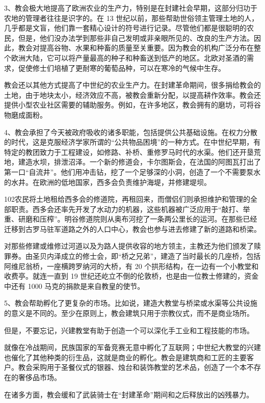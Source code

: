 3、教会极大地提高了欧洲农业的生产力，特别是在封建社会早期，这部分归功于农地的管理者往往是识字的。在 13 世纪以前，那些帮助世俗领主管理土地的人，几乎都是文盲，他们靠一套精心设计的符号进行记录。尽管他们都是很聪明的农民，但是，他们没办法学到那些非自己发明或非亲眼所见的、改良的生产方法。因此，教会对提高谷物、水果和种畜的质量至关重要。因为教会的机构广泛分布在整个欧洲大陆，它可以将产量最高的种子和种畜送到低产的地区。北欧对圣酒的需求，促使修士们培植了更耐寒的葡萄品种，可以在寒冷的气候中生存。

教会还以其他方式提高了中世纪的农业生产力。在封建革命期间，很多捐给教会的土地，由于地块太小，经济效应不高，被教会重新分配，以提高耕作效率。教会还提供小型农业社区需要的辅助服务。例如，在许多地区，教会拥有的磨坊，可将谷物磨成面粉。

4、教会承担了今天被政府吸收的诸多职能，包括提供公共基础设施。在权力分散的时代，这是克服经济学家所谓的“公共物品困境”的一种方式。在中世纪早期，有特定的教团致力于工程建设，如修路、补桥、重修罗马时代的水渠。他们还开垦荒地，建造水坝，排泄沼泽。一个新的修道会，卡尔图斯会，在法国的阿图瓦打出了第一口“自流井”。他们用冲击钻，挖了一个足够深的小洞，创造了一个不需要泵水的水井。在欧洲的低地国家，西多会负责维护海堤，并修建堤坝。

102农民将土地租给西多会的修道院，再租回来，而僧侣们则承担维护和管理的全部职责。西多会还率先开发了水动力的机器，这些机器被广泛应用于“敲打、举重、研磨和压榨”。明谷修道院则从奥布河挖了一条两公里长的运河。在那些已经迁移到古罗马驻军道路之外的人口中心，教会也参与进去修建了新的道路和桥梁。

对那些修建或维修过河道以及为路人提供收容的地方领主，主教还为他们颁发了赎罪券。由圣贝内泽成立的修士会，即“桥之兄弟”，建造了当时最长的几座桥，包括阿维尼翁桥，一座横跨罗纳河的大桥，有 20 个拱形结构，在一边有一个小教堂和收费亭。就连一直到 19 世纪还屹立不倒的伦敦桥，也是由一位教士修建的，资金中还有 1000 马克的捐款是来自教皇的使节。

5、教会帮助孵化了更复杂的市场。比如说，建造大教堂与桥梁或水渠等公共设施的意义是不同的。至少在原则上，教会建筑只用于宗教仪式，而不是商业场所。

但是，不要忘记，兴建教堂有助于创造一个可以深化手工业和工程技能的市场。

就像在冷战期间，民族国家的军备竞赛无意中孵化了互联网；中世纪大教堂的兴建也催化了其他种类的衍生品，这就是商业的孵化。教会是建筑商和工匠的主要客户。教会采购用于圣餐仪式的银器、烛台和装饰教堂的艺术品，创造了一个本不存在的奢侈品市场。

在诸多方面，教会缓和了武装骑士在“封建革命”期间和之后释放出的凶残暴力。

